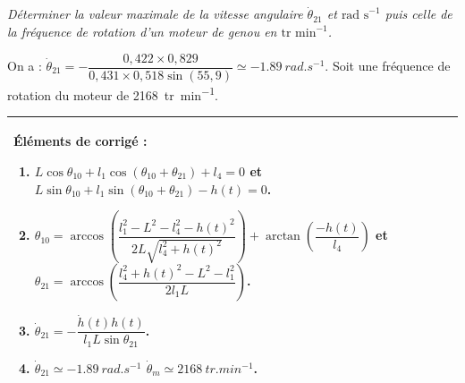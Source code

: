 \documentclass[10pt,fleqn]{article} %
\begin{document}
\begin{multicols}{2}
\subparagraph{}\textit{Déterminer la valeur maximale de la vitesse angulaire $\dot{\theta}_{21}$ et $\text{rad s}^{-1}$ puis celle de la fréquence de rotation d’un moteur de genou en $\text{tr min}^{-1}$.}
\ifprof
\begin{corrige}
On a : $\dot{\theta}_{21} =-\dfrac{0,422 \times 0,829}{0,431\times 0,518\sin \left(55,9\right)}\simeq -\SI{1,89}{rad.s^{-1}}$. Soit une fréquence de rotation du moteur de \SI{2168}{tr.min^{-1}}.
\end{corrige}
\else
\fi



















\ifprof
\else

\noindent 
\footnotesize
\begin{tabular}{|p{.95\linewidth}|}
\hline
Éléments de corrigé :
\begin{enumerate}
\item $L\cos\theta_{10} +l_1\cos\left(\theta_{10}+\theta_{21}\right)+l_4={0}$ et 
$L\sin\theta_{10}  +l_1\sin\left(\theta_{10}+\theta_{21}\right)-h(t) ={0}$.
\item $\theta_{10} =\arccos \left( \dfrac{l_1^2 - L^2-l_4^2 -h(t)^2}{2L{\sqrt{l_4^2 + h(t)^2}}}\right) + \arctan\left(\dfrac{-h(t)}{l_4} \right)$ et $\theta_{21}=\arccos\left(\dfrac{l_4 ^2 +h(t)^2- L^2 - l_1^2}{2l_1L}  \right)$. 
\item $\dot{\theta}_{21} =-\dfrac{\dot{h}(t)h(t)}{l_1L\sin\theta_{21}}$.
\item $\dot{\theta}_{21} \simeq -\SI{1,89}{rad.s^{-1}}$ $\dot{\theta}_m\simeq \SI{2168}{tr.min^{-1}}$.
\end{enumerate} \\
\hline
\end{tabular}
\normalsize
\fi

\ifprof
\else
\end{multicols}
\fi

\end{document}
